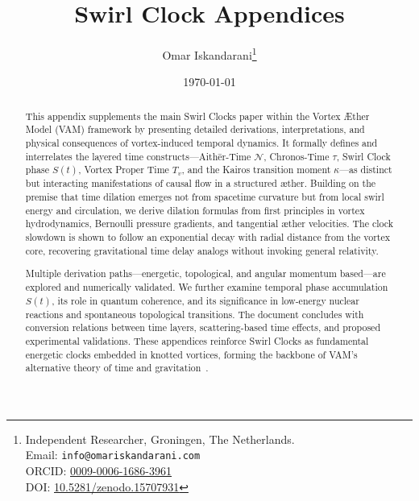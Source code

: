 \documentclass[a4paper,12pt]{article}
\title{Swirl Clock Appendices\\[0.5em]}
\author{
    Omar Iskandarani\thanks{
        Independent Researcher, Groningen, The Netherlands.\\
        Email: \texttt{info@omariskandarani.com}\\
        ORCID: \href{https://orcid.org/0009-0006-1686-3961}{0009-0006-1686-3961}\\
        DOI: \href{https://doi.org/10.5281/zenodo.15707931}{10.5281/zenodo.15707931}
    }
}
\date{\today}
\begin{document}
    \maketitle
    \vspace{-2ex}


\begin{abstract}
This appendix supplements the main Swirl Clocks paper within the Vortex \AE{}ther Model (VAM) framework by presenting detailed derivations, interpretations, and physical consequences of vortex-induced temporal dynamics. It formally defines and interrelates the layered time constructs—Aithēr-Time \( \mathcal{N} \), Chronos-Time \( \tau \), Swirl Clock phase \( S(t) \), Vortex Proper Time \( T_v \), and the Kairos transition moment \( \kappa \)—as distinct but interacting manifestations of causal flow in a structured æther. Building on the premise that time dilation emerges not from spacetime curvature but from local swirl energy and circulation, we derive dilation formulas from first principles in vortex hydrodynamics, Bernoulli pressure gradients, and tangential \ae{}ther velocities. The clock slowdown is shown to follow an exponential decay with radial distance from the vortex core, recovering gravitational time delay analogs without invoking general relativity.

Multiple derivation paths—energetic, topological, and angular momentum based—are explored and numerically validated. We further examine temporal phase accumulation \( S(t) \), its role in quantum coherence, and its significance in low-energy nuclear reactions and spontaneous topological transitions. The document concludes with conversion relations between time layers, scattering-based time effects, and proposed experimental validations. These appendices reinforce Swirl Clocks as fundamental energetic clocks embedded in knotted vortices, forming the backbone of VAM’s alternative theory of time and gravitation~\cite{iskandarani2025vam0, iskandarani2025vam1, iskandarani2025vam2, iskandarani2025VAM3}.
\end{abstract}



    \vfill

\newpage
\tableofcontents
\newpage

%
%
%
%
%
%
%
%
%
%
%
\end{document}
